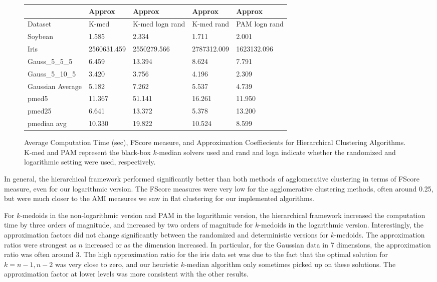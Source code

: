 \documentclass{article}
\begin{document}
\begin{figure*}[h]
\begin{tabular}{ | l | l | l | l | l | }
\hline
	   & Approx & Approx & Approx & Approx \\ \hline
	Dataset & K-med & K-med logn rand & K-med rand & PAM logn rand \\ \hline
	Soybean & 1.585 & 2.334 & 1.711 & 2.001 \\ 
	Iris & 2560631.459 & 2550279.566 & 2787312.009 & 1623132.096 \\ 
	Gauss\_5\_5\_5 & 6.459 & 13.394 & 8.624 & 7.791 \\
	Gauss\_5\_10\_5 &  3.420 & 3.756 & 4.196 & 2.309  \\
	Gaussian Average & 5.182 & 7.262  & 5.537 & 4.739 \\ 
	pmed5 & 11.367 & 51.141 & 16.261 & 11.950 \\ 
	pmed25 & 6.641 & 13.372 & 5.378 & 13.200 \\ 
	pmedian avg & 10.330 & 19.822 & 10.524 & 8.599 \\ \hline
\end{tabular}

\caption{Average Computation Time (sec), FScore measure, and Approximation Coeffiecients for Hierarchical Clustering Algorithms. K-med and PAM represent the black-box $k$-median solvers used and rand and logn indicate whether the randomized and logarithmic setting were used, respectively.}
\end{figure*}

In general, the hierarchical framework performed significantly better than both methods of agglomerative clustering in terms of FScore measure, even for our logarithmic version. The FScore measures were very low for the agglomerative clustering methods, often around 0.25, but were much closer to the AMI measures we saw in flat clustering for our implemented algorithms. 

For $k$-medoids in the non-logarithmic version and PAM in the logarithmic version, the hierarchical framework increased the computation time by three orders of magnitude, and increased by two orders of magnitude for $k$-medoids in the logarithmic version. Interestingly, the approximation factors did not change significantly between the randomized and deterministic versions for $k$-medoids. The approximation ratios were strongest as $n$ increased or as the dimension increased. In particular, for the Gaussian data in 7 dimensions, the approximation ratio was often around 3.  The high approximation ratio for the iris data set was due to the fact that the optimal solution for $k = n-1, n-2$ was very close to zero, and our heuristic $k$-median algorithm only sometimes picked up on these solutions. The approximation factor at lower levels was more consistent with the other results. 
\end{document}
